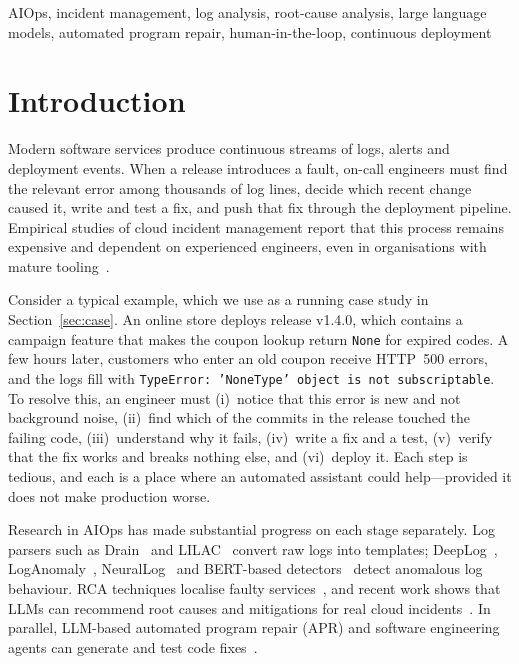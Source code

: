 \documentclass[conference]{IEEEtran}
\begin{document}
\begin{IEEEkeywords}
AIOps, incident management, log analysis, root-cause analysis, large language models, automated program repair, human-in-the-loop, continuous deployment
\end{IEEEkeywords}

\section{Introduction}
Modern software services produce continuous streams of logs, alerts and deployment events. When a release introduces a fault, on-call engineers must find the relevant error among thousands of log lines, decide which recent change caused it, write and test a fix, and push that fix through the deployment pipeline. Empirical studies of cloud incident management report that this process remains expensive and dependent on experienced engineers, even in organisations with mature tooling~\cite{chen2020icm,notaro2021survey}.

Consider a typical example, which we use as a running case study in Section~\ref{sec:case}. An online store deploys release v1.4.0, which contains a campaign feature that makes the coupon lookup return \texttt{None} for expired codes. A few hours later, customers who enter an old coupon receive HTTP~500 errors, and the logs fill with \texttt{TypeError: 'NoneType' object is not subscriptable}. To resolve this, an engineer must (i)~notice that this error is new and not background noise, (ii)~find which of the commits in the release touched the failing code, (iii)~understand why it fails, (iv)~write a fix and a test, (v)~verify that the fix works and breaks nothing else, and (vi)~deploy it. Each step is tedious, and each is a place where an automated assistant could help---provided it does not make production worse.

Research in AIOps has made substantial progress on each stage separately. Log parsers such as Drain~\cite{he2017drain} and LILAC~\cite{jiang2024lilac} convert raw logs into templates; DeepLog~\cite{du2017deeplog}, LogAnomaly~\cite{meng2019loganomaly}, NeuralLog~\cite{le2021neurallog} and BERT-based detectors~\cite{guo2021logbert,lee2023lanobert,delacruz2026loganomaly} detect anomalous log behaviour. RCA techniques localise faulty services~\cite{wu2020microrca,ma2020automap,soldani2022survey}, and recent work shows that LLMs can recommend root causes and mitigations for real cloud incidents~\cite{ahmed2023recommending,chen2024rcacopilot,roy2024exploring}. In parallel, LLM-based automated program repair (APR) and software engineering agents can generate and test code fixes~\cite{xia2023apr,bouzenia2025repairagent,zhang2024autocoderover,yang2024sweagent}.
\end{document}
